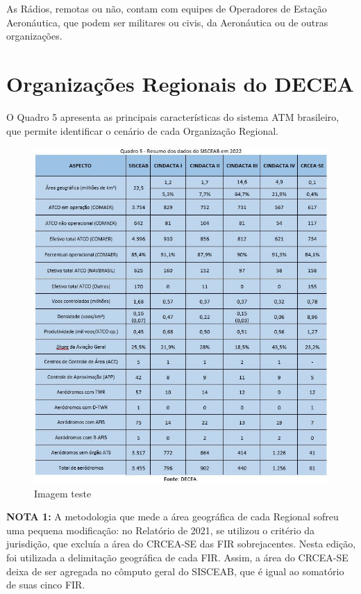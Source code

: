\documentclass[
]{book}
\theoremstyle{definition}
\theoremstyle{definition}
\theoremstyle{definition}
\theoremstyle{definition}
\theoremstyle{remark}
\begin{document}
As Rádios, remotas ou não, contam com equipes de Operadores de Estação Aeronáutica, que podem ser militares ou civis, da Aeronáutica ou de outras organizações.

\hypertarget{organizauxe7uxf5es-regionais-do-decea}{%
\section{Organizações Regionais do DECEA}\label{organizauxe7uxf5es-regionais-do-decea}}

O Quadro 5 apresenta as principais características do sistema ATM brasileiro, que permite identificar o cenário de cada Organização Regional.

\begin{figure}
\centering
\includegraphics{imagens/fig11.jpg}
\caption{Imagem teste}
\end{figure}

\textbf{NOTA 1:} A metodologia que mede a área geográfica de cada Regional sofreu uma pequena modificação: no Relatório de 2021, se utilizou o critério da jurisdição, que excluía a área do CRCEA-SE das FIR sobrejacentes. Nesta edição, foi utilizada a delimitação geográfica de cada FIR. Assim, a área do CRCEA-SE deixa de ser agregada no cômputo geral do SISCEAB, que é igual ao somatório de suas cinco FIR.
\end{document}
